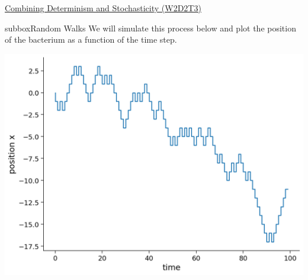 \begin{textbox}{\href{https://compneuro.neuromatch.io/tutorials/W2D2_LinearSystems/student/W2D2_Tutorial3.html}{Combining Determinism and Stochasticity (W2D2T3)} }
\begin{subbox}{subbox}{Random Walks}
We will simulate this process below and plot the position of the bacterium as a function of the time step.
\begin{center}
\includegraphics[scale=0.25]{Figures/LS/CDS_Figure1.png}
\end{center}
\end{subbox}
\end{textbox}
